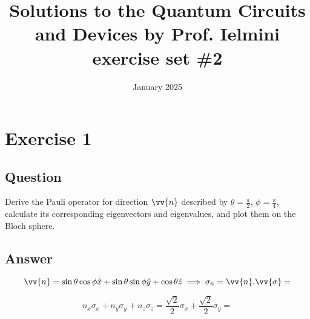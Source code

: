 \documentclass{article}
\title{Solutions to the Quantum Circuits and Devices by Prof. Ielmini exercise set \#2}
\author{}
\date{January 2025}
\begin{document}
\maketitle

\section{Exercise 1}
\subsection{Question}
Derive the Pauli operator for direction $\vv{n}$ described by $\theta = \frac{\pi}{2}$, $\phi = \frac{\pi}{4}$, calculate its corresponding eigenvectors and eigenvalues, and plot them on the Bloch sphere.
\subsection{Answer}
$$\vv{n} = \sin{\theta}\cos{\phi}\hat{x} + \sin{\theta}\sin{\phi}\hat{y} + \cos{\theta}\hat{z} \implies \sigma_{\hat{n}} = \vv{n}.\vv{\sigma} = $$

$$n_x\sigma_x + n_y\sigma_y + n_z\sigma_z = \frac{\sqrt{2}}{2}\sigma_x + \frac{\sqrt{2}}{2}\sigma_y = $$
\end{document}
